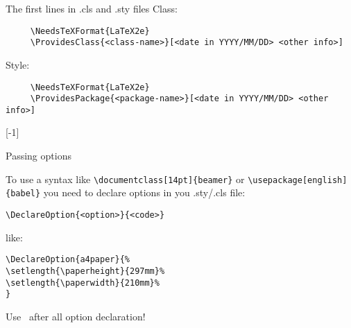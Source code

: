 \graphicspath{{sec03/images/}{sec03/code/}}
\lstset{inputpath=sec03/code/}

\begin{frame}[fragile]{The first lines in .cls and .sty files}\relax
     Class:
     \begin{lstlisting}
     \NeedsTeXFormat{LaTeX2e}
     \ProvidesClass{<class-name>}[<date in YYYY/MM/DD> <other info>]
     \end{lstlisting}
     
     Style:
     \begin{lstlisting}
     \NeedsTeXFormat{LaTeX2e}
     \ProvidesPackage{<package-name>}[<date in YYYY/MM/DD> <other info>]
     \end{lstlisting}
     
     [-1]
     
    
\end{frame}


\begin{frame}[fragile]{Passing options}\relax

    To use a syntax like \verb|\documentclass[14pt]{beamer}| or \verb|\usepackage[english]{babel}| you need to declare options in you .sty/.cls file:
    
    \begin{lstlisting}
\DeclareOption{<option>}{<code>}
    \end{lstlisting}
    
    like:
    \begin{lstlisting}
\DeclareOption{a4paper}{%
\setlength{\paperheight}{297mm}%
\setlength{\paperwidth}{210mm}%
}
    \end{lstlisting}
    
    Use \ccol\ProcessOptions\ after all option declaration!


\end{frame}

